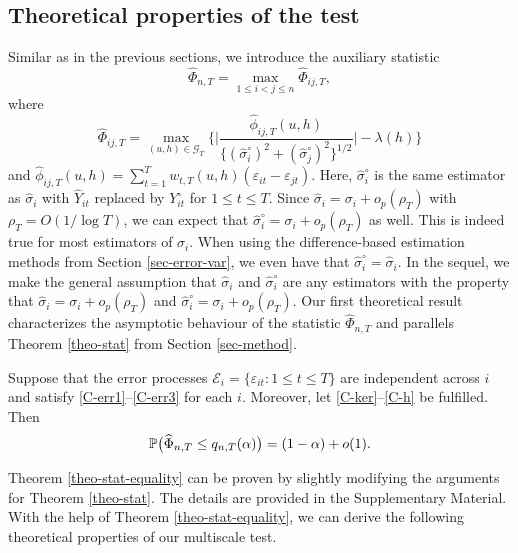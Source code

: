 \subsection{Theoretical properties of the test}\label{subsec-test-equality-theo}


Similar as in the previous sections, we introduce the auxiliary statistic 
\[ \widehat{\Phi}_{n,T} = \max_{1 \le i < j \le n} \widehat{\Phi}_{ij,T}, \]
where
\[ \widehat{\Phi}_{ij,T} = \max_{(u,h) \in \mathcal{G}_T} \Big\{ \Big| \frac{\widehat{\phi}_{ij,T}(u,h)} {\{ (\widehat{\sigma}_i^\circ)^2 + (\widehat{\sigma}_j^\circ)^2 \}^{1/2}} \Big| - \lambda(h) \Big \} \]
and $\widehat{\phi}_{ij,T}(u,h) = \sum_{t=1}^T w_{t,T}(u,h) (\varepsilon_{it} - \varepsilon_{jt})$. Here, $\widehat{\sigma}_i^\circ$ is the same estimator as $\widehat{\sigma}_i$ with $\widehat{Y}_{it}$ replaced by $Y_{it}^\circ$ for $1 \le t \le T$. Since $\widehat{\sigma}_i = \sigma_i + o_p(\rho_T)$ with $\rho_T = O(1/\log T)$, we can expect that $\widehat{\sigma}_i^\circ = \sigma_i + o_p(\rho_T)$ as well. This is indeed true for most estimators of $\sigma_i$. When using the difference-based estimation methods from Section \ref{sec-error-var}, we even have that $\widehat{\sigma}_i^\circ = \widehat{\sigma}_i$. In the sequel, we make the general assumption that $\widehat{\sigma}_i$ and $\widehat{\sigma}_i^\circ$ are any estimators with the property that $\widehat{\sigma}_i = \sigma_i + o_p(\rho_T)$ and $\widehat{\sigma}_i^\circ = \sigma_i + o_p(\rho_T)$. Our first theoretical result characterizes the asymptotic behaviour of the statistic $\widehat{\Phi}_{n,T}$ and parallels Theorem \ref{theo-stat} from Section \ref{sec-method}. 
\begin{theorem}\label{theo-stat-equality}
Suppose that the error processes $\mathcal{E}_i = \{ \varepsilon_{it}: 1 \le t \le T \}$ are independent across $i$ and satisfy \ref{C-err1}--\ref{C-err3} for each $i$. Moreover, let \ref{C-ker}--\ref{C-h} be fulfilled. Then 
\[ \mathbb{P} \big( \widehat{\Phi}_{n,T} \le q_{n,T}(\alpha) \big) = (1 - \alpha) + o(1). \]
\end{theorem}
Theorem \ref{theo-stat-equality} can be proven by slightly modifying the arguments for Theorem \ref{theo-stat}. The details are provided in the Supplementary Material. With the help of Theorem \ref{theo-stat-equality}, we can derive the following theoretical properties of our multiscale test. 
